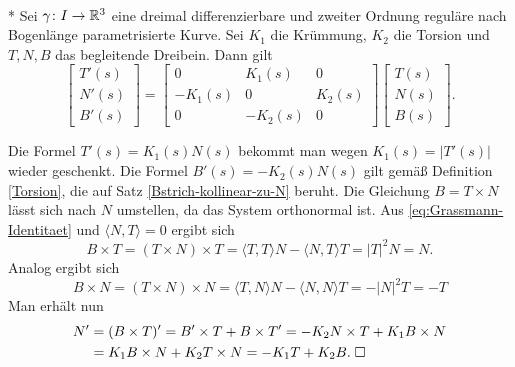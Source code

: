 \begin{theorem}\mbox{}\\*
Sei $\gamma\colon I\to\mathbb R^3$ eine dreimal differenzierbare und zweiter
Ordnung reguläre nach Bogenlänge parametrisierte Kurve.
Sei $K_1$ die Krümmung, $K_2$ die Torsion und $T,N,B$ das begleitende
Dreibein. Dann gilt%
\begin{equation}
\begin{bmatrix}
T'(s)\\ N'(s)\\ B'(s)
\end{bmatrix}
= \begin{bmatrix}
0 & K_1(s) & 0\\
-K_1(s) & 0 & K_2(s)\\
0 & -K_2(s) & 0
\end{bmatrix}
\begin{bmatrix}
T(s)\\ N(s)\\ B(s)
\end{bmatrix}.
\end{equation}
\end{theorem}

\noindent{}
Die Formel $T'(s)=K_1(s)N(s)$ bekommt man wegen $K_1(s)=|T'(s)|$
wieder geschenkt. Die Formel $B'(s)=-K_2(s)N(s)$ gilt gemäß
Definition \ref{Torsion}, die auf Satz \ref{Bstrich-kollinear-zu-N}
beruht. Die Gleichung $B=T\times N$ lässt sich nach $N$ umstellen,
da das System orthonormal ist. Aus \eqref{eq:Grassmann-Identitaet}
und $\langle N,T\rangle=0$ ergibt sich
\begin{equation}
B\times T = (T\times N)\times T
= \langle T,T\rangle N - \langle N,T\rangle T
= |T|^2 N = N.
\end{equation}
Analog ergibt sich
\begin{equation}
B\times N = (T\times N)\times N
= \langle T,N\rangle N - \langle N,N\rangle T
= -|N|^2 T = -T
\end{equation}
Man erhält nun
\begin{align}
N' &= (B\times T)' = B'\times T+B\times T'
= -K_2 N\times T+K_1 B\times N\\
&= K_1 B\times N+K_2 T\times N
= -K_1 T + K_2 B.\;\Box
\end{align}
